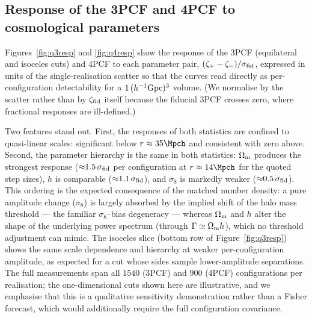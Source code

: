 
\subsection{Response of the 3PCF and 4PCF to cosmological parameters}
\label{sec:responses}

Figures~\ref{fig:q3resp} and \ref{fig:q4resp} show the response of the
3PCF (equilateral and isoceles cuts) and 4PCF to each parameter pair,
$(\zeta_{+} - \zeta_{-})/\sigma_{\rm fid}$, expressed in units of the
single-realisation scatter so that the curves read directly as
per-configuration detectability for a $1\,(h^{-1}{\rm Gpc})^3$ volume.
(We normalise by the scatter rather than by $\zeta_{\rm fid}$ itself
because the fiducial 3PCF crosses zero, where fractional responses are
ill-defined.)

Two features stand out.  First, the responses of both statistics are
confined to quasi-linear scales: significant below
$r \approx 35\Mpch$ and consistent with zero above.  Second, the
parameter hierarchy is the same in both statistics:
$\Omega_{\rm m}$ produces the strongest response
(${\approx}1.5\,\sigma_{\rm fid}$ per configuration at
$r \approx 14\Mpch$ for the quoted step sizes), $h$ is comparable
(${\approx}1.1\,\sigma_{\rm fid}$), and $\sigma_8$ is markedly weaker
(${\approx}0.5\,\sigma_{\rm fid}$).  This ordering is the expected
consequence of the matched number density: a pure amplitude change
($\sigma_8$) is largely absorbed by the implied shift of the halo mass
threshold --- the familiar $\sigma_8$--bias degeneracy --- whereas
$\Omega_{\rm m}$ and $h$ alter the shape of the underlying power
spectrum (through $\Gamma \simeq \Omega_{\rm m} h$), which no threshold
adjustment can mimic.  The isoceles slice (bottom row of Figure~\ref{fig:q3resp}) shows the
same scale dependence and hierarchy at weaker per-configuration
amplitude, as expected for a cut whose sides sample lower-amplitude
separations.  The full measurements span all $1540$ (3PCF) and
$900$ (4PCF) configurations per realisation; the one-dimensional cuts
shown here are illustrative, and we emphasise that this is a qualitative
sensitivity demonstration rather than a Fisher forecast, which would
additionally require the full configuration covariance.

